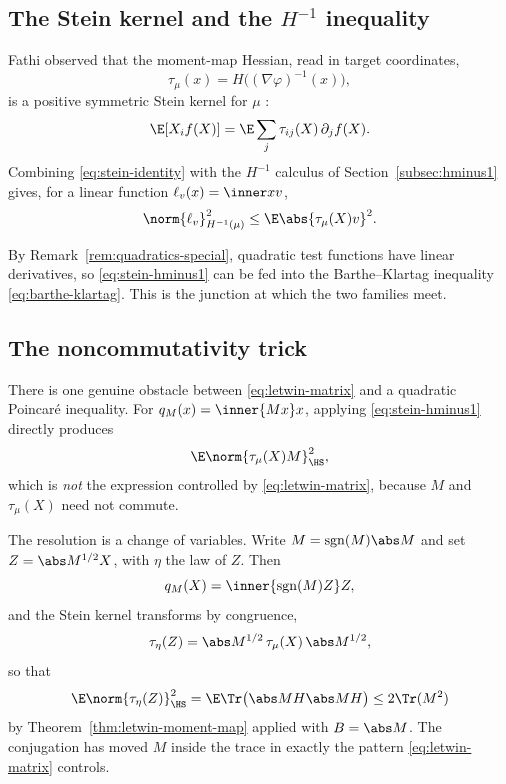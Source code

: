 \documentclass[../../main.tex]{subfiles}
\begin{document}
\subsection{The Stein kernel and the \texorpdfstring{$H^{-1}$}{H-1} inequality}
\label{subsec:mm-stein}

Fathi observed that the moment-map Hessian, read in target coordinates,
\begin{equation}
  \tau_\mu(x)=H\bigl((\nabla\varphi)^{-1}(x)\bigr),
  \label{eq:stein-kernel-def}
\end{equation}
is a positive symmetric Stein kernel for $\mu$ \cite{Fathi2019SteinMomentMaps}:
\begin{equation}
  \E[X_if(X)]=\E\sum_j\tau_{ij}(X)\,\partial_jf(X).
  \label{eq:stein-identity}
\end{equation}
Combining \eqref{eq:stein-identity} with the $H^{-1}$ calculus of Section~\ref{subsec:hminus1}
gives, for a linear function $\ell_v(x)=\inner xv$,
\begin{equation}
  \norm{\ell_v}_{H^{-1}(\mu)}^2\le\E\abs{\tau_\mu(X)v}^2 .
  \label{eq:stein-hminus1}
\end{equation}

By Remark~\ref{rem:quadratics-special}, quadratic test functions have linear derivatives, so
\eqref{eq:stein-hminus1} can be fed into the Barthe--Klartag inequality
\eqref{eq:barthe-klartag}. This is the junction at which the two families meet.

\subsection{The noncommutativity trick}
\label{subsec:mm-noncommutativity}

There is one genuine obstacle between \eqref{eq:letwin-matrix} and a quadratic Poincar\'e
inequality. For $q_M(x)=\inner{Mx}x$, applying \eqref{eq:stein-hminus1} directly produces
\[
  \E\norm{\tau_\mu(X)M}_{\HS}^2 ,
\]
which is \emph{not} the expression controlled by \eqref{eq:letwin-matrix}, because $M$ and
$\tau_\mu(X)$ need not commute.

The resolution is a change of variables. Write $M=\operatorname{sgn}(M)\abs M$ and set
$Z=\abs M^{1/2}X$, with $\eta$ the law of $Z$. Then
\[
  q_M(X)=\inner{\operatorname{sgn}(M)Z}Z ,
\]
and the Stein kernel transforms by congruence,
\begin{equation}
  \tau_\eta(Z)=\abs M^{1/2}\,\tau_\mu(X)\,\abs M^{1/2},
  \label{eq:stein-congruence}
\end{equation}
so that
\begin{equation}
  \E\norm{\tau_\eta(Z)}_{\HS}^2=\E\Tr\bigl(\abs MH\abs MH\bigr)\le2\Tr(M^2)
  \label{eq:conjugated-bound}
\end{equation}
by Theorem~\ref{thm:letwin-moment-map} applied with $B=\abs M$. The conjugation has moved $M$
inside the trace in exactly the pattern \eqref{eq:letwin-matrix} controls.
\end{document}

